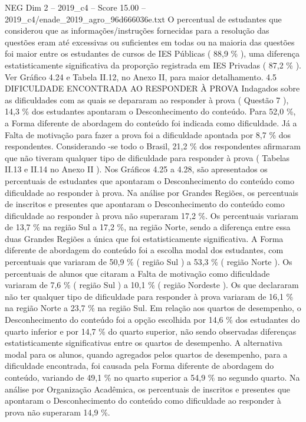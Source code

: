 \begin{textsample}{NEG Dim 2 – 2019\_c4 – Score 15.00 – 2019\_c4/enade\_2019\_agro\_96d666036e.txt}
O percentual de estudantes que considerou que as informações/instruções fornecidas para a resolução das questões eram até excessivas ou suficientes em todas ou na maioria das questões foi maior entre os estudantes de cursos de IES Públicas ( 88,9 \% ), uma diferença estatisticamente significativa da proporção registrada em IES Privadas ( 87,2 \% ).
Ver Gráfico 4.24 e Tabela II.12, no Anexo II, para maior detalhamento. 4.5 DIFICULDADE ENCONTRADA AO RESPONDER À PROVA Indagados sobre as dificuldades com as quais se depararam ao responder à prova ( Questão 7 ), 14,3 \% dos estudantes apontaram o Desconhecimento do conteúdo.
Para 52,0 \%, a Forma diferente de abordagem do conteúdo foi indicada como dificuldade.
Já a Falta de motivação para fazer a prova foi a dificuldade apontada por 8,7 \% dos respondentes.
Considerando -se todo o Brasil, 21,2 \% dos respondentes afirmaram que não tiveram qualquer tipo de dificuldade para responder à prova ( Tabelas II.13 e II.14 no Anexo II ).
Nos Gráficos 4.25 a 4.28, são apresentados os percentuais de estudantes que apontaram o Desconhecimento do conteúdo como dificuldade ao responder à prova.
Na análise por Grandes Regiões, os percentuais de inscritos e presentes que apontaram o Desconhecimento do conteúdo como dificuldade ao responder à prova não superaram 17,2 \%.
Os percentuais variaram de 13,7 \% na região Sul a 17,2 \%, na região Norte, sendo a diferença entre essa duas Grandes Regiões a única que foi estatisticamente significativa.
A Forma diferente de abordagem do conteúdo foi a escolha modal dos estudantes, com percentuais que variaram de 50,9 \% ( região Sul ) a 53,3 \% ( região Norte ).
Os percentuais de alunos que citaram a Falta de motivação como dificuldade variaram de 7,6 \% ( região Sul ) a 10,1 \% ( região Nordeste ).
Os que declararam não ter qualquer tipo de dificuldade para responder à prova variaram de 16,1 \% na região Norte a 23,7 \% na região Sul.
Em relação aos quartos de desempenho, o Desconhecimento do conteúdo foi a opção escolhida por 14,6 \% dos estudantes do quarto inferior e por 14,7 \% do quarto superior, não sendo observadas diferenças estatisticamente significativas entre os quartos de desempenho.
A alternativa modal para os alunos, quando agregados pelos quartos de desempenho, para a dificuldade encontrada, foi causada pela Forma diferente de abordagem do conteúdo, variando de 49,1 \% no quarto superior a 54,9 \% no segundo quarto.
Na análise por Organização Acadêmica, os percentuais de inscritos e presentes que apontaram o Desconhecimento do conteúdo como dificuldade ao responder à prova não superaram 14,9 \%.

\end{textsample}
